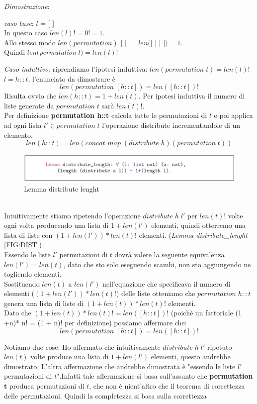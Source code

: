 \documentclass[a4paper]{article}
\newenvironment{dimostrazione}{\textit{Dimostrazione}:\begin{adjustwidth}{1cm}{}}{\end{adjustwidth}}
\begin{document}
\begin{dimostrazione}
	\textit{caso base}: $l$ = [ ]\\
	In questo caso $len(l)! = 0! = 1$.\\
	Allo stesso modo $len(permutation)$ [ ] $= len($[ [ ] ]$) = 1$.\\
	Quindi $len($\textit{permutation} $l) = len(l)!$
	
	\textit{Caso induttivo}: riprendiamo l'ipotesi induttiva: $len(permutation \; t) = len(t)!$
	$l = h::t$, l'enunciato da dimostrare è $$len(permutation \; [h::t]) = len([h::t])!$$
	Risulta ovvio che $len(h::t) = 1 + len(t)$.
	Per ipotesi induttiva il numero di liste generate da $permutation \; t$ sarà $len(t)!$.\\
	Per definizione \textbf{permutation h::t} calcola tutte le permutazioni di $t$ e poi applica ad ogni lista $l' \in permutation \;t$ l'operazione distribute incrementandole di un elemento.
	$$len(h::t) = len(concat\_map \; (distribute \; h) (permutation \; t))$$
\begin{figure}[!ht]
\centering
\includegraphics[width=1\textwidth]{./img/A3_distribute.png}
\caption{Lemma distribute lenght} \label{FIG:A3_distribute}
\end{figure}\\
Intuitivamente stiamo ripetendo l'operazione $distribute \; h \; l'$ per $len(t) ! $ volte ogni volta producendo una lista di $1 + len(l')$ elementi, quindi otterremo una lista di liste con $(1 + len(l')) * len(t)! $ elementi. (\textit{Lemma distribute\_lenght} \ref{FIG:DIST})\\
	Essendo le liste $l'$ permutazioni di $t$ dovrà valere la seguente equivalenza $len(l') = len(t) $, dato che sto solo eseguendo scambi, non sto aggiungendo ne togliendo elementi.\\
		Sostituendo $len(t)$ a $len(l')$ nell'equazione che specificava il numero di elementi ($(1 + len(l')) * len(t)! $) delle liste otteniamo che $permutation  \; h::t$ genera una lista di liste di $(1+len(t)) * len(t)!$ elementi.\\
	Dato che $(1+len(t)) * len(t)! = len([h::t])!$ (poichè un fattoriale (1 +n)* n! = (1 + n)! per definizione) possiamo affermare che: 
	$$len(permutation \; [h::t]) = len([h::t])!$$
\end{dimostrazione}
Notiamo due cose:
Ho affermato che intuitivamente $distribute \; h \; l'$ ripetuto $len(t)$ volte produce una lista di $ 1 + len(l')$ elementi, questo andrebbe dimostrato.
L'altra affermazione che andrebbe dimostrata è "essendo le liste $l'$ permutazioni di $t$".Infatti tale affermazione si basa sull'assunto che \textbf{permutation t} produca permutazioni di $t$, che non è nient'altro che il teorema di correttezza delle permutazioni.
Quindi la completezza si basa sulla correttezza
\end{document}
